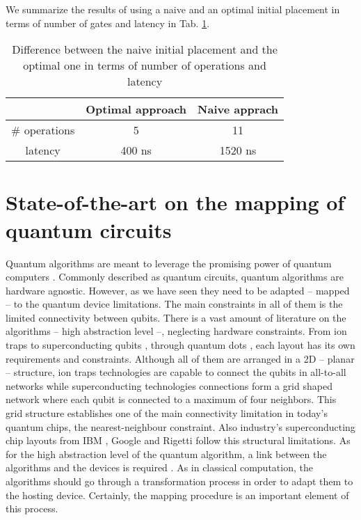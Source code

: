 \begin{enumerate}
We summarize the results of using a naive and an optimal initial placement in terms of number of gates and latency in Tab. \ref{tab:optima_vs_naive}.


\begin{table}[htbp]
\caption{\label{tab:optima_vs_naive}
Difference between the naive initial placement and the optimal one in terms of number of operations and latency}
\centering
\begin{tabular}{ccc}
\hline
 & Optimal approach & Naive apprach\\
\hline
\# operations & 5 & 11\\
latency & 400 ns & 1520 ns\\
\hline
\end{tabular}
\end{table}
\end{enumerate}

\section{State-of-the-art on the mapping of quantum circuits}
\label{sec:orgcc4f1c8}
Quantum algorithms are meant to leverage the promising power of quantum computers \cite{coles18:quant_algor_implem_begin}.
Commonly described as quantum circuits, quantum algorithms are hardware agnostic.
However, as we have seen they need to be adapted -- mapped -- to the quantum device limitations.
The main constraints in all of them is the limited connectivity between qubits.
There is a vast amount of literature on the algorithms -- high abstraction level --, neglecting hardware constraints.
From ion traps \cite{Dousti_2012} to superconducting qubits \cite{Barends_2014,Versluis_2017}, through quantum dots \cite{Hill_2015,Li_2018}, each layout has its own requirements and constraints.
Although all of them are arranged in a 2D -- planar -- structure, ion traps technologies are capable to connect the qubits in all-to-all networks while superconducting technologies connections form a grid shaped network where each qubit is connected to a maximum of four neighbors.
This grid structure establishes one of the main connectivity limitation in today's quantum chips, the nearest-neighbour constraint.
Also industry's superconducting chip layouts from IBM \cite{IBM_QX}, Google \cite{boixo16:charac_quant_suprem_near_term_devic} and Rigetti \cite{Sete_2016} follow this structural limitations.
As for the high abstraction level of the quantum algorithm, a link between the algorithms and the devices is required \cite{Fu_2016}.
As in classical computation, the algorithms should go through a transformation process in order to adapt them to the hosting device.
Certainly, the mapping procedure is an important element of this process.

